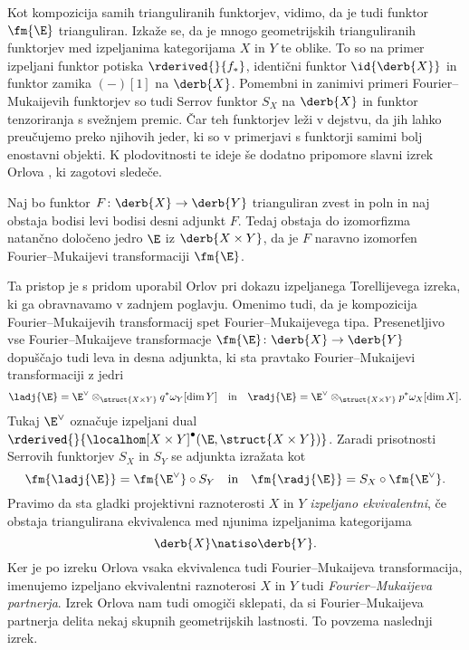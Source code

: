 Kot kompozicija samih trianguliranih funktorjev, vidimo, da je tudi funktor $\fm{\E}$ trianguliran. Izkaže se, da je mnogo geometrijskih trianguliranih funktorjev med izpeljanima kategorijama $X$ in $Y$ te oblike. To so na primer izpeljani funktor potiska $\rderived{}{f_*}$, identični funktor $\id{\derb{X}}$ in funktor zamika $(-)[1]$ na $\derb{X}$. Pomembni in zanimivi primeri Fourier--Mukaijevih funktorjev so tudi Serrov funktor $S_X$ na $\derb{X}$ in funktor tenzoriranja s svežnjem premic. Čar teh funktorjev leži v dejstvu, da jih lahko preučujemo preko njihovih jeder, ki so v primerjavi s funktorji samimi bolj enostavni objekti. K plodovitnosti te ideje še dodatno pripomore slavni izrek Orlova \cite{Orlov2003}, ki zagotovi sledeče.

\begin{izrek}
    Naj bo funktor $F \colon \derb{X} \to \derb{Y}$ trianguliran zvest in poln in naj obstaja bodisi levi bodisi desni adjunkt $F$. Tedaj obstaja do izomorfizma natančno določeno jedro $\E$ iz $\derb{X \times Y}$, da je $F$ naravno izomorfen Fourier--Mukaijevi transformaciji $\fm{\E}$.
\end{izrek}
Ta pristop je s pridom uporabil Orlov \cite{Orlov2003} pri dokazu izpeljanega Torellijevega izreka, ki ga obravnavamo v zadnjem poglavju. Omenimo tudi, da je kompozicija Fourier--Mukaijevih transformacij spet Fourier--Mukai\-je\-vega tipa. Presenetljivo vse Fourier--Mu\-kai\-jeve transformacje $\fm{\E} \colon \derb{X} \to \derb{Y}$ dopuščajo tudi leva in desna adjunkta, ki sta pravtako Fourier--Mukaijevi transformaciji z jedri 
\[
    \ladj{\E} = \E^\vee \otimes_{\struct{X \times Y}} q^*\omega_Y[\dim Y] \quad \text{in} \quad 
    \radj{\E} = \E^\vee \otimes_{\struct{X \times Y}} p^*\omega_X[\dim X].
\]
Tukaj $\E^\vee$ označuje izpeljani dual $\rderived{}{\localhom[X \times Y]^\bullet(\E, \struct{X\times Y})}$. Zaradi prisotnosti Serrovih funktorjev $S_X$ in $S_Y$ se adjunkta izražata kot
\begin{equation*}
    \fm{\ladj{\E}} = \fm{\E^\vee} \circ S_Y \quad \text{in} \quad 
    \fm{\radj{\E}} = S_X \circ \fm{\E^\vee}.
\end{equation*}
Pravimo da sta gladki projektivni raznoterosti $X$ in $Y$ \emph{izpeljano ekvivalentni}, če obstaja triangulirana ekvivalenca med njunima izpeljanima kategorijama
\[
    \derb{X} \natiso \derb{Y}.
\]
Ker je po izreku Orlova vsaka ekvivalenca tudi Fourier--Mukaijeva transformacija, imenujemo izpeljano ekvivalentni raznoterosi $X$ in $Y$ tudi \emph{Fourier--Mukaijeva partnerja}. Izrek Orlova nam tudi omogiči sklepati, da si Fourier--Mukaijeva partnerja delita nekaj skupnih geometrijskih lastnosti. To povzema naslednji izrek.

